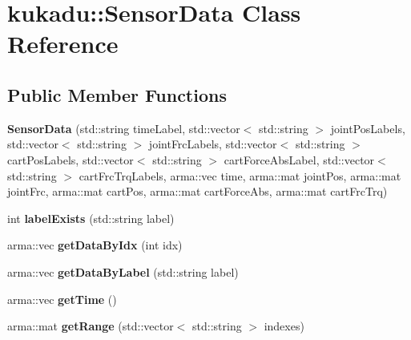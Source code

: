 \hypertarget{classkukadu_1_1SensorData}{\section{kukadu\-:\-:Sensor\-Data Class Reference}
\label{classkukadu_1_1SensorData}
}
\subsection*{Public Member Functions}
\begin{DoxyCompactItemize}
\item 
\hypertarget{classkukadu_1_1SensorData_a25da82f97fd543d3f2a038da4ba8dbbf}{{\bfseries Sensor\-Data} (std\-::string time\-Label, std\-::vector$<$ std\-::string $>$ joint\-Pos\-Labels, std\-::vector$<$ std\-::string $>$ joint\-Frc\-Labels, std\-::vector$<$ std\-::string $>$ cart\-Pos\-Labels, std\-::vector$<$ std\-::string $>$ cart\-Force\-Abs\-Label, std\-::vector$<$ std\-::string $>$ cart\-Frc\-Trq\-Labels, arma\-::vec time, arma\-::mat joint\-Pos, arma\-::mat joint\-Frc, arma\-::mat cart\-Pos, arma\-::mat cart\-Force\-Abs, arma\-::mat cart\-Frc\-Trq)}\label{classkukadu_1_1SensorData_a25da82f97fd543d3f2a038da4ba8dbbf}

\item 
\hypertarget{classkukadu_1_1SensorData_ae4659342261e7cf3df9d2e76b784dbcf}{int {\bfseries label\-Exists} (std\-::string label)}\label{classkukadu_1_1SensorData_ae4659342261e7cf3df9d2e76b784dbcf}

\item 
\hypertarget{classkukadu_1_1SensorData_a9fc8b3e8a18362bfeed829c75372487f}{arma\-::vec {\bfseries get\-Data\-By\-Idx} (int idx)}\label{classkukadu_1_1SensorData_a9fc8b3e8a18362bfeed829c75372487f}

\item 
\hypertarget{classkukadu_1_1SensorData_ade9735bb77f4ddeb3f251d9503afac8d}{arma\-::vec {\bfseries get\-Data\-By\-Label} (std\-::string label)}\label{classkukadu_1_1SensorData_ade9735bb77f4ddeb3f251d9503afac8d}

\item 
\hypertarget{classkukadu_1_1SensorData_a875c3c3c6bfb0035aeb71304d17631bc}{arma\-::vec {\bfseries get\-Time} ()}\label{classkukadu_1_1SensorData_a875c3c3c6bfb0035aeb71304d17631bc}

\item 
\hypertarget{classkukadu_1_1SensorData_abcd21262bfc8dc0de0abd48184b0467f}{arma\-::mat {\bfseries get\-Range} (std\-::vector$<$ std\-::string $>$ indexes)}\label{classkukadu_1_1SensorData_abcd21262bfc8dc0de0abd48184b0467f}


\end{DoxyCompactItemize}
